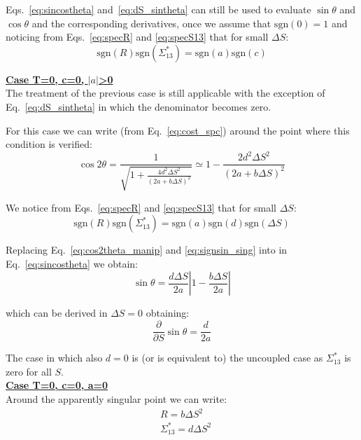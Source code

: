 Eqs.~\ref{eq:sincostheta} and~\ref{eq:dS_sintheta} can still be used to evaluate $\sin \theta$ and $\cos \theta$ and the corresponding derivatives, once we assume that $\mathrm{sgn}(0) = 1$ and noticing from Eqs.~\ref{eq:specR} and \ref{eq:specS13} that for small $\Delta S$:
\begin{equation}
\mathrm{sgn}(R)\mathrm{sgn}(\Sigma^*_{13}) = \mathrm{sgn}(a)\mathrm{sgn}(c)
\end{equation}


\textbf{\underline{Case T=0, c=0, $\left| a \right|$>0}}
~\\

The treatment of the previous case is still applicable with the exception of Eq.~\ref{eq:dS_sintheta} in which the denominator becomes zero.

For this case we can write (from Eq.~\ref{eq:cost_spc}) around the point where this condition is verified:
\begin{equation}
\cos 2\theta =  \frac{1}{\sqrt{1+\frac{4d^2 \Delta S^2}{\left(2a +b \Delta S\right)^2}}} \simeq  
1-\frac{2d^2 \Delta S^2}{\left(2a +b \Delta S\right)^2}
\label{eq:cos2theta_manip}
\end{equation}

We notice from Eqs.~\ref{eq:specR} and \ref{eq:specS13} that for small $\Delta S$:
\begin{equation}
\mathrm{sgn}(R)\mathrm{sgn}(\Sigma^*_{13}) = \mathrm{sgn}(a)\mathrm{sgn}(d)\mathrm{sgn}(\Delta S)\label{eq:signsin_sing}
\end{equation}

Replacing Eq.~\ref{eq:cos2theta_manip} and \ref{eq:signsin_sing} into in Eq.~\ref{eq:sincostheta}
we obtain:
\begin{equation}
\sin\theta =  \frac{d\Delta S}{2a} \left| 1 - \frac{b \Delta S}{2a}\right|
\end{equation}

which can be derived in $\Delta S = 0$ obtaining:
\begin{equation}
\frac{\partial }{\partial S} \sin \theta =\frac{d}{2a} 
\end{equation}

The case in which also $d=0$ is (or is equivalent to) the uncoupled case as $\Sigma^*_{13}$ is zero for all $S$.
~\\


\textbf{\underline{Case T=0, c=0, a=0}}
~\\

Around the apparently singular point we can write:
\begin{align}
&R = b \Delta S^2\\
&\Sigma^*_{13} =d \Delta S^2
\end{align}

